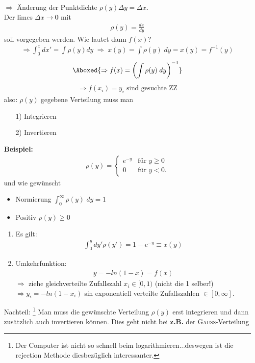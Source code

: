 \documentclass[12pt]{article}
\begin{document}
\begin{itemize}
$\Rightarrow$ Änderung der Punktdichte $\rho(y)\Delta y = \Delta x$. \\
Der limes $\Delta x \to 0$ mit 
\begin{align*}
\rho(y)=\frac{dx}{dy}
\end{align*}
soll vorgegeben werden. Wie lautet dann $f(x)$?
\begin{align}
\Rightarrow  \int_0^x dx' = \int \rho(y) dy \; \Rightarrow \; x(y) = \int \rho(y) \; dy = x(y) = f^{-1}(y) 
\end{align}
\begin{align}
\Aboxed{\Rightarrow  f(x)= \left( \int \rho(y) \; dy \right)^{-1} }
\end{align}
\begin{align*}
\Rightarrow  f(x_i)=y_i \mbox{ sind gesuchte ZZ}
\end{align*} 
also: $\rho(y)$ gegebene Verteilung muss man 
\begin{enumerate}
\item[1)] Integrieren
\item[2)] Invertieren
\end{enumerate}

\textbf{ Beispiel:}
 \begin{align*}
  \rho(y)=
 \begin{cases}
e^{-y} & \text{für } y \geq 0 \\
0 & \text{für } y < 0.
 \end{cases}
 \end{align*}
 und wie gewünscht 
 
 \begin{itemize}
	 \item Normierung 
  		$\int_0^\infty  \rho(y) \; dy = 1 $
 	\item Positiv
 		$\rho(y) \geq 0 $
\end{itemize}

 \begin{enumerate}
 \item Es gilt: \begin{align*}
 \int_0^y dy' \rho(y') = 1- e^{-y} \equiv x(y)
 \end{align*}
 \item Umkehrfunktion:
  \begin{align*}
 y= - ln(1-x) = f(x)
 \end{align*}
 $\Rightarrow$ ziehe gleichverteilte Zufallszahl $x_i \in [0,1)$ (nicht die 1 selber!) \\
 $\Rightarrow y_i = -ln(1-x_i)$ sin exponentiell verteilte Zufallszahlen $\in [0,\infty]$.
 \end{enumerate}
 Nachteil: 
\footnote{Der Computer ist nicht so schnell beim logarithmieren...deswegen ist die rejection Methode diesbezüglich interessanter.}
Man muss die gewünschte Verteilung $\rho(y)$ erst integrieren und dann zusätzlich auch invertieren können. Dies geht nicht bei \textbf{z.B.} der \textsc{Gauß}-Verteilung


\end{itemize}
\end{document}
